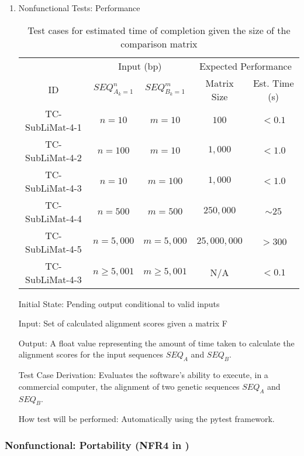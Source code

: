 \documentclass[12pt, titlepage]{article}
\begin{document}
\begin{enumerate}

\item{Nonfunctional Tests: Performance}


\begin{table}[h]
  \begin{tabular}{|c|c c|c c|}
  \hline 
    & \multicolumn{2}{c|}{Input (bp)} & \multicolumn{2}{c|}{Expected Performance} \\
  \cline{2-5}
  ID & $SEQ_{A_k=1}^n$ & $SEQ_{B_k=1}^m$ & Matrix Size & Est. Time (s) \\
  \hline
  TC-SubLiMat-4-1 & $n=10$ & $m=10$ & $100$ & $< 0.1$ \\
  \hline
  TC-SubLiMat-4-2 & $n=100$ & $m=10$ & $1,000$ & $< 1.0$ \\
  \hline
  TC-SubLiMat-4-3 & $n=10$ & $m=100$ & $1,000$ & $< 1.0$ \\
  \hline
  TC-SubLiMat-4-4 & $n=500$ & $m=500$ & $250,000$ & $\sim 25$ \\
  \hline
  TC-SubLiMat-4-5 & $n=5,000$ & $m=5,000$ & $25,000,000$ & $> 300$ \\
  \hline
  TC-SubLiMat-4-3 & $n \geq 5,001$ & $m \geq 5,001$ & N/A & $< 0.1$ \\
  \hline
  \end{tabular}
  \caption{Test cases for estimated time of completion given the size of the comparison matrix}
  \label{tab:test-case-2}
\end{table}


Initial State: Pending output conditional to valid inputs
					
Input: Set of calculated alignment scores given a matrix F
					
Output: A float value representing the amount of time taken to calculate the alignment scores for the input sequences
 $SEQ_A$ and $SEQ_B$.

Test Case Derivation: Evaluates the software's ability to execute, in a commercial computer, the alignment of two genetic sequences
 $SEQ_A$ and $SEQ_B$.


How test will be performed: Automatically using the pytest framework.

\end{enumerate}

\subsubsection{Nonfunctional: Portability (NFR4 in \citet{SRS})}
\end{document}

